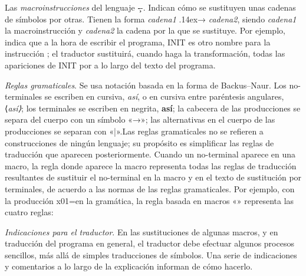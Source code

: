 \listademos
{}

Las {\it macroinstrucciones} del lenguaje \c--. Indican cómo se sustituyen unas cadenas de símbolos
por otras. Tienen la forma {\hskip3pt{\it cadena1} {\fflecha\lower.14ex\hbox{→}} {\it cadena2}},
siendo {\it cadena1} la macroinstrucción y {\it cadena2} la cadena por la que se sustituye. Por
ejemplo,  indica que a la hora de escribir el programa, {\fcode INIT} es otro
nombre para la instrucción {}; el traductor sustituirá, cuando haga la transformación, todas
las apariciones de {\fcode INIT} por {} a lo largo del texto del programa.

{\it Reglas gramaticales}. Se usa notación basada en la forma de Backus–Naur. Los no-terminales se
escriben en cursiva, {\it así}, o en cursiva entre paréntesis angulares, {\fcode⟨\it así\fcode⟩};
los terminales se escriben en negrita, {\bf así}; la cabecera de las producciones se separa del
cuerpo con un símbolo «→»; las alternativas en el cuerpo de las producciones se separan con
«{\fcode|}».\pseudopar Las reglas gramaticales no se refieren a construcciones de ningún lenguaje;
su propósito es simplificar las reglas de traducción que aparecen posteriormente. Cuando un
no-terminal aparece en una macro, la regla donde aparece la macro representa todas las reglas de
traducción resultantes de sustituir el no-terminal en la macro y en el texto de sustitución por
terminales, de acuerdo a las normas de las reglas gramaticales. Por ejemplo, con la
producción \gramatprod x01=\estrella \fin en la gramática, la regla basada en macros
{\def\supuno{\super{\fsup1}}«\macroins{\fcodenoterm x\supuno}{\fcodenoterm x}» representa las cuatro
reglas:\hfil\break{\def\mk{\kern-.2em}\hbadness=10000\hbox to 3.4in{\vbox to 18pt{}\hskip9.5pt\macroins{1\supuno\mk}{1}; \macroins{0\supuno\mk}{0};
\macroins{=\supuno\mk}{=}; \macroins{\estrella\supuno\mk}{\estrella}.}}}

{\it Indicaciones para el traductor}. En las sustituciones de algunas macros, y en traducción del
programa en general, el traductor debe efectuar algunos procesos sencillos, más allá de simples
traducciones de símbolos. Una serie de indicaciones y comentarios a lo largo de la explicación
informan de cómo hacerlo.

